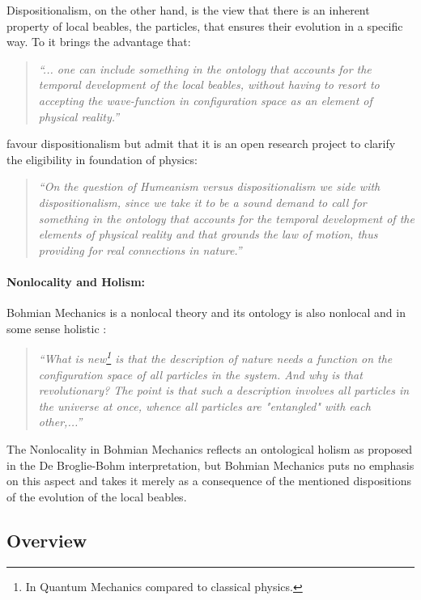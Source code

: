 \documentclass{article}
\begin{document}
Dispositionalism, on the other hand, is the view that there is an inherent property of local beables, the particles, that ensures their evolution in a specific way. To \cite[]{esfeld2013ontology} it brings the advantage that: 

\begin{quote}
\textit{``... one can include something in the ontology that accounts for the temporal
development of the local beables, without having to resort to accepting the
wave-function in configuration space as an element of physical reality.''}
\end{quote}

\cite[]{esfeld2013ontology} favour dispositionalism but admit that it is an open research project to clarify the eligibility in foundation of physics:
\begin{quote}
\textit{``On the question of Humeanism versus dispositionalism we side with dispositionalism, since we take it to be a sound demand to call for something in the ontology that accounts for the temporal development of the elements of physical reality and that grounds the law of motion, thus providing for real connections in nature.''}
\end{quote}


\paragraph{Nonlocality and Holism:}

Bohmian Mechanics is a nonlocal theory and its ontology is also nonlocal and in some sense holistic \cite[p.131]{durr2009bohmian}: 

\begin{quote}
\textit{``What is new\footnote{In Quantum Mechanics compared to classical physics.} is that the description of nature needs a function on the configuration space of all particles in the system. And why is that revolutionary? The point is that such a description involves all particles in the universe at once, whence all particles are "entangled" with each other,...''}
\end{quote}

The Nonlocality in Bohmian Mechanics reflects an ontological holism as proposed in the De Broglie-Bohm interpretation, but Bohmian Mechanics puts no emphasis on this aspect and takes it merely as a consequence of the mentioned dispositions of the evolution of the local beables. 

\newpage

\subsection*{Overview}
\end{document}
